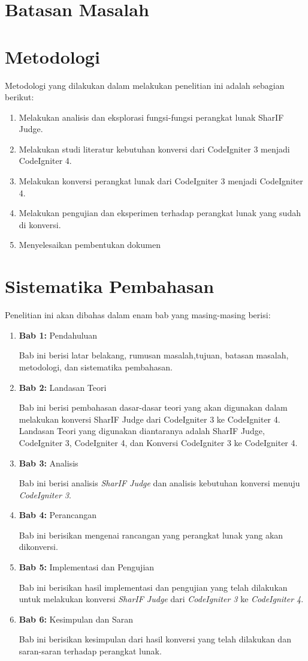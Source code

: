 \section{Batasan Masalah}
\label{sec:batasan}



\section{Metodologi}
\label{sec:metlit}
Metodologi yang dilakukan dalam melakukan penelitian ini adalah sebagian berikut:
\begin{enumerate}
	\item Melakukan analisis dan eksplorasi fungsi-fungsi perangkat lunak SharIF Judge.
	\item Melakukan studi literatur kebutuhan konversi dari CodeIgniter 3 menjadi CodeIgniter 4.
	\item Melakukan konversi perangkat lunak dari CodeIgniter 3 menjadi CodeIgniter 4.
	\item Melakukan pengujian dan eksperimen terhadap perangkat lunak yang sudah di konversi.
	\item Menyelesaikan pembentukan dokumen
\end{enumerate}

\section{Sistematika Pembahasan}
\label{sec:sispem}
Penelitian ini akan dibahas dalam enam bab yang masing-masing berisi:
\begin{enumerate}
	\item \textbf{Bab 1:} Pendahuluan
	
	Bab ini berisi latar belakang, rumusan masalah,tujuan, batasan masalah, metodologi, dan sistematika pembahasan.
	\item \textbf{Bab 2:} Landasan Teori
	
	Bab ini berisi pembahasan dasar-dasar teori yang akan digunakan dalam melakukan konversi SharIF Judge dari CodeIgniter 3 ke CodeIgniter 4. Landasan Teori yang digunakan diantaranya adalah SharIF Judge, CodeIgniter 3, CodeIgniter 4, dan Konversi CodeIgniter 3 ke CodeIgniter 4.
	\item \textbf{Bab 3:} Analisis
	
	Bab ini berisi analisis \textit{SharIF Judge} dan analisis kebutuhan konversi menuju \textit{CodeIgniter 3}.
	\item \textbf{Bab 4:} Perancangan
	
	Bab ini berisikan mengenai rancangan yang perangkat lunak yang akan dikonversi.
	\item \textbf{Bab 5:} Implementasi dan Pengujian
	
	Bab ini berisikan hasil implementasi dan pengujian yang telah dilakukan untuk melakukan konversi \textit{SharIF Judge} dari \textit{CodeIgniter 3} ke \textit{CodeIgniter 4}.
	\item \textbf{Bab 6:} Kesimpulan dan Saran
	
	Bab ini berisikan kesimpulan dari hasil konversi yang telah dilakukan dan saran-saran terhadap perangkat lunak.
\end{enumerate}

